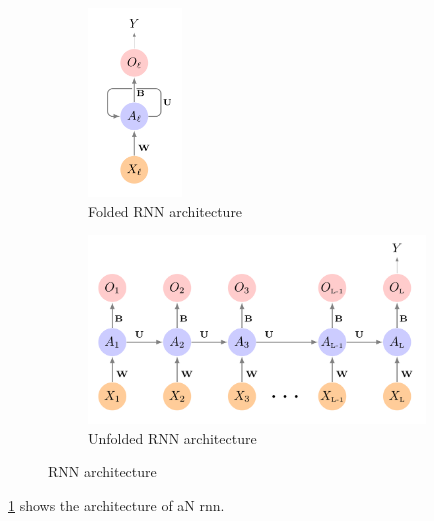 \documentclass[12pt]{article}
\begin{document}
\begin{figure}
  \begin{subfigure}{0.45\columnwidth}
    \centering
    \begin{adjustbox}
      \includegraphics[height=5cm]{texfiles/figures/rnn-folded.png}
    \end{adjustbox}
    \caption{Folded RNN architecture}
    \label{fig:rnn-folded}
  \end{subfigure}
  \begin{subfigure}{0.45\columnwidth}
    \centering
    \begin{adjustbox}
      \includegraphics[height=5cm]{texfiles/figures/rnn-unfolded.png}
    \end{adjustbox}
    \caption{Unfolded RNN architecture}
    \label{fig:rnn-unfolded}
  \end{subfigure}
  \caption{RNN architecture \cite{james_deep_2023}}
  \label{fig:rnn-arch}
\end{figure}

\cref{fig:rnn-folded} shows the architecture of aN \gls{rnn}. 
\end{document}
